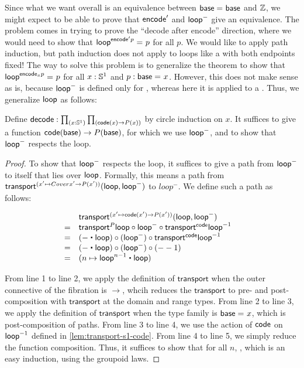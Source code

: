 Since what we want overall is an equivalence between $\mathsf{base} =_{} \mathsf{base}$
and $\mathbb{Z}$, we might expect to be able to prove that $\mathsf{encode}'$
and $\mathsf{loop}^-$ give an equivalence.  The problem comes in trying to prove
the ``decode after encode'' direction, where we would need to show that
$\mathsf{loop}^{\mathsf{encode}' p} =_{} p$ for all $p$.  We would like to apply path
induction, but path induction does not apply to loops like a with both
endpoints fixed!  The way to solve this problem is to generalize the
theorem to show that $\mathsf{loop}^{{\mathsf{encode}_x p}} =_{} p$ for all $x: \mathbb{S} ^1$
and $p : \mathsf{base} =_{} x$.  However, this does not make sense as is, because
$\mathsf{loop}^-$ is defined only for \id{\base}{\base}, whereas here it is
applied to a .  Thus, we generalize 
$\mathsf{loop}$ as follows:

\begin{defn}
Define $\decode : \prd{x : \Sn ^1}{\code(x) \rightarrow P(x)}$ by 
circle induction on $x$.  It suffices to give a function 
${\mathsf{code}(\mathsf{base}) \rightarrow P(\mathsf{base})}$, for which we use $\mathsf{loop}^-$, and 
to show that $\mathsf{loop}^-$ respects the loop.  
\end{defn}

\begin{proof}
To show that $\mathsf{loop}^-$ respects the loop, it suffices to give a path
from $\mathsf{loop}^-$ to itself that lies over $\mathsf{loop}$. 
Formally, this means a path from $\mathsf{transport}^{(x' \mapsto Cover x'
\rightarrow P(x'))}(\mathsf{loop},\mathsf{loop}^-)$ to $loop^-$.  We define such a
path as follows:

\[
\begin{array}{lll}
  & \transfib {(x' \mapsto \code(x') \rightarrow P(x'))} \lloop {\lloop^-} & \\
= & \transfibf P \lloop \circ {\lloop^-} \circ \transfibf \code {\opp \lloop} & \\
= & (- \ct \lloop) \circ (\lloop^-) \circ \transfibf \code {\opp \lloop} & \\
= & (- \ct \lloop) \circ (\lloop^-) \circ (- - 1) & \\
= & (n \mapsto \lloop^{n - 1} \ct \lloop) \\                       
\end{array}
\]

From line 1 to line 2, we apply the definition of $\mathsf{transport}$
when the outer connective of the fibration is $\rightarrow$, whcih
reduces the $\mathsf{transport}$ to pre- and post-composition with
$\mathsf{transport}$ at the domain and range types.  From line 2 to line
3, we apply the definition of $\mathsf{transport}$ when the type family
is $\mathsf{base} =_{} x$, which is post-composition of paths.  From line 3 to
line 4, we use the action of $\mathsf{code}$ on $\mathord{{\mathsf{loop}}^{-1}}$ defined in
\autoref{lem:transport-s1-code}.  From line 4 to line 5, we simply
reduce the function composition.  Thus, it suffices to show that for all
$n$, , which is an easy
induction, using the groupoid laws.  
\end{proof}

